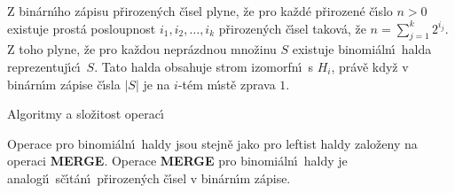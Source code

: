 \flushpar Z bin\'arn\'\i ho z\'apisu p\v rirozen\'ych \v c\'\i sel plyne, \v ze 
pro ka\v zd\'e p\v riro\-ze\-n\'e \v c\'\i slo $n>0$ existuje prost\'a 
posloupnost $i_1,i_2,\dots,i_k$ p\v riro\-ze\-n\'ych \v c\'\i sel takov\'a, \v ze 
$n=\sum_{j=1}^k2^{i_j}$. Z toho plyne, \v ze pro ka\v zdou nepr\'azd\-nou 
mno\v zinu $S$ existuje binomi\'aln\'\i\ halda repre\-zentuj\'\i c\'\i\ $
S$.
Tato halda obsahuje strom izomorfn\'\i\ s $H_i$, pr\'av\v e kdy\v z v 
bin\'arn\'\i m z\'apise \v c\'\i sla $|S|$ je na $i$-t\'em m\'\i st\v e zprava $
1$.
\bigskip

\head
Algoritmy a slo\v zitost operac\'\i
\endhead

\flushpar Operace pro binomi\'aln\'\i\ haldy jsou  
stejn\v e jako pro leftist haldy zalo\v zeny na ope\-raci {\bf MER\-GE}. Ope\-race 
{\bf MERGE} pro binomi\'aln\'\i\ haldy je analogi\'\i\ s\v c\'\i t\'an\'\i\ 
p\v rirozen\'ych \v c\'\i sel v bin\'ar\-n\'\i m z\'apise.
\bigskip

